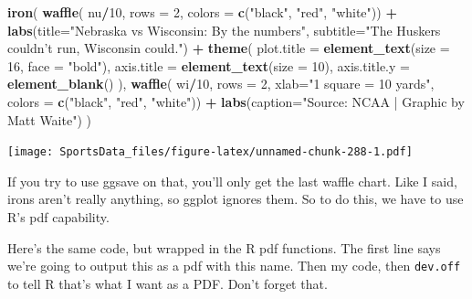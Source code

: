 \documentclass[
]{book}
\newenvironment{Shaded}{\begin{snugshade}}{\end{snugshade}}
\newcommand{\DataTypeTok}[1]{\textcolor[rgb]{0.13,0.29,0.53}{#1}}
\newcommand{\DecValTok}[1]{\textcolor[rgb]{0.00,0.00,0.81}{#1}}
\newcommand{\KeywordTok}[1]{\textcolor[rgb]{0.13,0.29,0.53}{\textbf{#1}}}
\newcommand{\NormalTok}[1]{#1}
\newcommand{\OperatorTok}[1]{\textcolor[rgb]{0.81,0.36,0.00}{\textbf{#1}}}
\newcommand{\StringTok}[1]{\textcolor[rgb]{0.31,0.60,0.02}{#1}}
\begin{document}
\begin{Shaded}
\begin{Highlighting}[]
\KeywordTok{iron}\NormalTok{(}
 \KeywordTok{waffle}\NormalTok{(}
\NormalTok{   nu}\OperatorTok{/}\DecValTok{10}\NormalTok{, }
   \DataTypeTok{rows =} \DecValTok{2}\NormalTok{, }
   \DataTypeTok{colors =} \KeywordTok{c}\NormalTok{(}\StringTok{"black"}\NormalTok{, }\StringTok{"red"}\NormalTok{, }\StringTok{"white"}\NormalTok{)) }\OperatorTok{+}\StringTok{ }
\StringTok{   }\KeywordTok{labs}\NormalTok{(}\DataTypeTok{title=}\StringTok{"Nebraska vs Wisconsin: By the numbers"}\NormalTok{, }\DataTypeTok{subtitle=}\StringTok{"The Huskers couldn't run, Wisconsin could."}\NormalTok{) }\OperatorTok{+}\StringTok{ }
\StringTok{   }\KeywordTok{theme}\NormalTok{(}
    \DataTypeTok{plot.title =} \KeywordTok{element_text}\NormalTok{(}\DataTypeTok{size =} \DecValTok{16}\NormalTok{, }\DataTypeTok{face =} \StringTok{"bold"}\NormalTok{),}
    \DataTypeTok{axis.title =} \KeywordTok{element_text}\NormalTok{(}\DataTypeTok{size =} \DecValTok{10}\NormalTok{),}
    \DataTypeTok{axis.title.y =} \KeywordTok{element_blank}\NormalTok{()}
\NormalTok{  ),}
 \KeywordTok{waffle}\NormalTok{(}
\NormalTok{   wi}\OperatorTok{/}\DecValTok{10}\NormalTok{, }
   \DataTypeTok{rows =} \DecValTok{2}\NormalTok{, }
   \DataTypeTok{xlab=}\StringTok{"1 square = 10 yards"}\NormalTok{, }
   \DataTypeTok{colors =} \KeywordTok{c}\NormalTok{(}\StringTok{"black"}\NormalTok{, }\StringTok{"red"}\NormalTok{, }\StringTok{"white"}\NormalTok{)) }\OperatorTok{+}\StringTok{ }\KeywordTok{labs}\NormalTok{(}\DataTypeTok{caption=}\StringTok{"Source: NCAA | Graphic by Matt Waite"}\NormalTok{)}
\NormalTok{) }
\end{Highlighting}
\end{Shaded}

\texttt{[image: SportsData\_files/figure-latex/unnamed-chunk-288-1.pdf]}

If you try to use ggsave on that, you'll only get the last waffle chart. Like I said, irons aren't really anything, so ggplot ignores them. So to do this, we have to use R's pdf capability.

Here's the same code, but wrapped in the R pdf functions. The first line says we're going to output this as a pdf with this name. Then my code, then \texttt{dev.off} to tell R that's what I want as a PDF. Don't forget that.
\end{document}
